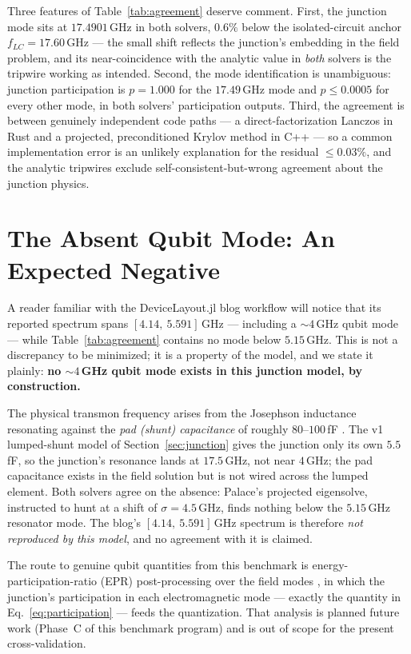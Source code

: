 \documentclass{anvil-paper}
\begin{document}
Three features of Table~\ref{tab:agreement} deserve comment. First, the
junction mode sits at $17.4901$\,GHz in both solvers, $0.6\%$ below the
isolated-circuit anchor $f_{LC} = 17.60$\,GHz --- the small shift reflects
the junction's embedding in the field problem, and its near-coincidence
with the analytic value in \emph{both} solvers is the tripwire working as
intended. Second, the mode identification is unambiguous: junction
participation is $p = 1.000$ for the $17.49$\,GHz mode and $p \leq 0.0005$
for every other mode, in both solvers' participation outputs. Third, the
agreement is between genuinely independent code paths --- a direct-factorization
Lanczos in Rust and a projected, preconditioned Krylov method in C++ ---
so a common implementation error is an unlikely explanation for the
residual $\leq 0.03\%$, and the analytic tripwires exclude
self-consistent-but-wrong agreement about the junction physics.

\section{The Absent Qubit Mode: An Expected Negative}
\label{sec:absent-mode}

A reader familiar with the DeviceLayout.jl blog workflow
\citep{devicelayout-blog} will notice that its reported spectrum spans
$[4.14,\ 5.591]$\,GHz --- including a ${\sim}4$\,GHz qubit mode --- while
Table~\ref{tab:agreement} contains no mode below $5.15$\,GHz. This is not a
discrepancy to be minimized; it is a property of the model, and we state it
plainly: \textbf{no ${\sim}4$\,GHz qubit mode exists in this junction model,
by construction.}

The physical transmon frequency arises from the Josephson inductance
resonating against the \emph{pad (shunt) capacitance} of roughly
$80$--$100$\,fF \citep{koch2007}. The v1 lumped-shunt model of
Section~\ref{sec:junction} gives the junction only its own $5.5$\,fF, so
the junction's resonance lands at $17.5$\,GHz, not near $4$\,GHz; the pad
capacitance exists in the field solution but is not wired across the
lumped element. Both solvers agree on the absence: Palace's projected
eigensolve, instructed to hunt at a shift of $\sigma = 4.5$\,GHz, finds
nothing below the $5.15$\,GHz resonator mode. The blog's
$[4.14,\ 5.591]$\,GHz spectrum is therefore \emph{not reproduced by this
model}, and no agreement with it is claimed.

The route to genuine qubit quantities from this benchmark is
energy-participation-ratio (EPR) post-processing over the field modes
\citep{minev2021,nigg2012}, in which the junction's participation in each
electromagnetic mode --- exactly the quantity in
Eq.~\ref{eq:participation} --- feeds the quantization. That analysis is
planned future work (Phase~C of this benchmark program) and is out of scope
for the present cross-validation.
\end{document}

